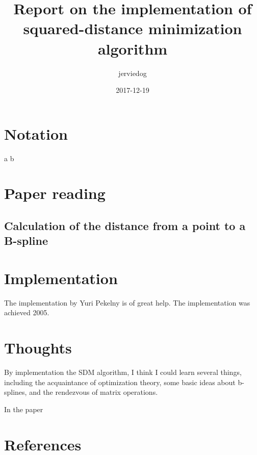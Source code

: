 \documentclass[a4paper,10pt]{article}
\begin{document}
% 
\title{Report on the implementation of squared-distance minimization algorithm}

\author{jerviedog}

\date{2017-12-19}

\maketitle

\tableofcontents

\section{Notation}
\begin{description}
\item{a} b
\end{description}

\section{Paper reading}

\subsection{Calculation of the distance from a point to a B-spline}

\section{Implementation}
The implementation by Yuri Pekelny is of great help. The implementation was achieved 2005.

\section{Thoughts}
By implementation the SDM algorithm, I think I could learn several things, including the acquaintance of optimization theory, some basic ideas about b-splines, and the rendezvous of matrix operations.

In the paper \cite{WPL2006}

\section{References}


\end{document}
